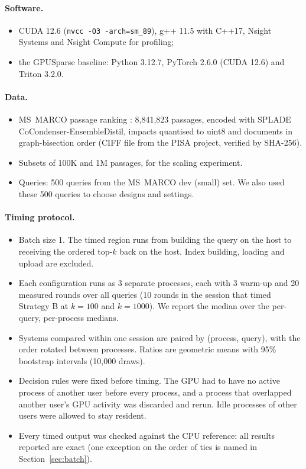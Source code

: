 \documentclass[11pt]{article}
\begin{document}
\paragraph{Software.}
\begin{itemize}
\item CUDA 12.6 (\texttt{nvcc -O3 -arch=sm\_89}), g++ 11.5 with C++17, Nsight Systems and
  Nsight Compute for profiling;
\item the GPUSparse baseline: Python 3.12.7, PyTorch 2.6.0 (CUDA 12.6) and Triton 3.2.0.
\end{itemize}

\paragraph{Data.}
\begin{itemize}
\item MS~MARCO passage ranking \cite{msmarco}: 8,841,823 passages, encoded with SPLADE
  CoCondenser-EnsembleDistil, impacts quantised to uint8 and documents in graph-bisection order (CIFF
  file from the PISA project, verified by SHA-256).
\item Subsets of 100K and 1M passages, for the scaling experiment.
\item Queries: 500 queries from the MS~MARCO dev (small) set. We also used these 500 queries to choose designs and settings.
\end{itemize}

\paragraph{Timing protocol.}
\begin{itemize}
\item Batch size 1. The timed region runs from building the query on the host to receiving the ordered
  top-$k$ back on the host. Index building, loading and upload are excluded.
\item Each configuration runs as 3 separate processes, each with 3 warm-up and 20 measured rounds over
  all queries (10 rounds in the session that timed Strategy B at $k=100$ and $k=1000$). We report the median over the per-query, per-process medians.
\item Systems compared within one session are paired by (process, query), with the order rotated between
  processes. Ratios are geometric means with 95\% bootstrap intervals (10,000 draws).
\item Decision rules were fixed before timing. The GPU had to have no active process of another user
  before every process, and a process that overlapped another user's GPU activity was discarded and rerun.
  Idle processes of other users were allowed to stay resident.
\item Every timed output was checked against the CPU reference: all results reported are exact (one exception on the
  order of ties is named in Section~\ref{sec:batch}).
\end{itemize}
\end{document}
